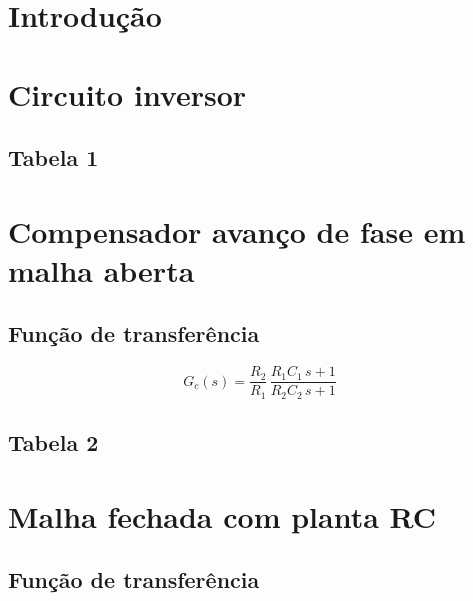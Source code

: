 
\section{Introdução}




\section{Circuito inversor}

\subsection{Tabela 1}





\section{Compensador avanço de fase em malha aberta}

\subsection{Função de transferência}

\begin{equation}
    G_c(s) = \frac{R_2}{R_1}\,\frac{R_1 C_1\, s + 1}{R_2 C_2\, s + 1}
\end{equation}

\subsection{Tabela 2}






\section{Malha fechada com planta RC}

\subsection{Função de transferência}

